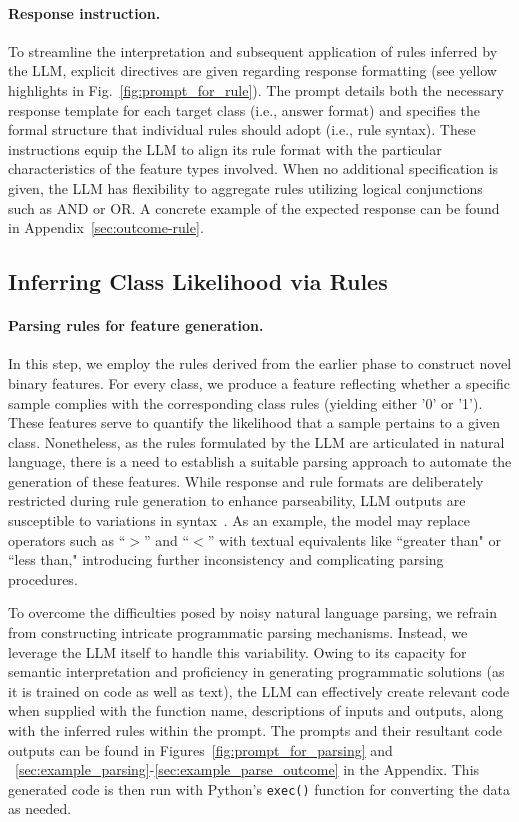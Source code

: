 \vspace*{-0.12in}
\paragraph{Response instruction.} To streamline the interpretation and subsequent application of rules inferred by the LLM, explicit directives are given regarding response formatting (see yellow highlights in Fig.~\ref{fig:prompt_for_rule}). The prompt details both the necessary response template for each target class (i.e., answer format) and specifies the formal structure that individual rules should adopt (i.e., rule syntax). These instructions equip the LLM to align its rule format with the particular characteristics of the feature types involved. When no additional specification is given, the LLM has flexibility to aggregate rules utilizing logical conjunctions such as AND or OR. A concrete example of the expected response can be found in Appendix~\ref{sec:outcome-rule}.

\subsection{Inferring Class Likelihood via Rules}
\label{Sec:training}

\paragraph{Parsing rules for feature generation.} In this step, we employ the rules derived from the earlier phase to construct novel binary features. For every class, we produce a feature reflecting whether a specific sample complies with the corresponding class rules (yielding either '0' or '1'). These features serve to quantify the likelihood that a sample pertains to a given class. Nonetheless, as the rules formulated by the LLM are articulated in natural language, there is a need to establish a suitable parsing approach to automate the generation of these features. While response and rule formats are deliberately restricted during rule generation to enhance parseability, LLM outputs are susceptible to variations in syntax~\cite{kovavc2023large}. As an example, the model may replace operators such as ``$>$” and ``$<$” with textual equivalents like ``greater than" or ``less than," introducing further inconsistency and complicating parsing procedures.

To overcome the difficulties posed by noisy natural language parsing, we refrain from constructing intricate programmatic parsing mechanisms. Instead, we leverage the LLM itself to handle this variability. Owing to its capacity for semantic interpretation and proficiency in generating programmatic solutions (as it is trained on code as well as text), the LLM can effectively create relevant code when supplied with the function name, descriptions of inputs and outputs, along with the inferred rules within the prompt. The prompts and their resultant code outputs can be found in Figures~\ref{fig:prompt_for_parsing} and ~\ref{sec:example_parsing}-\ref{sec:example_parse_outcome} in the Appendix. This generated code is then run with Python’s \texttt{exec()} function for converting the data as needed.

